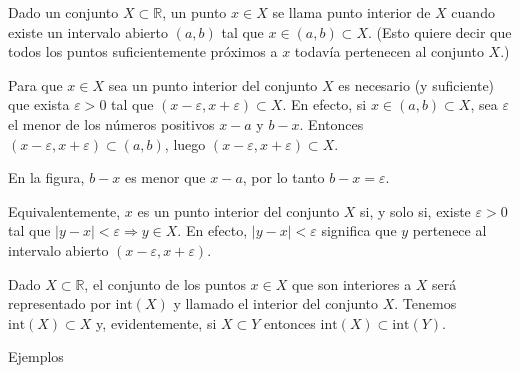 \documentclass[12pt,oneside]{book}
\begin{document}
Dado un conjunto \(X \subset \mathbb{R}\), un punto \(x \in X\) se llama punto interior de \(X\) cuando existe un intervalo abierto \((a, b)\) tal que \(x \in (a, b) \subset X\). (Esto quiere decir que todos los puntos suficientemente próximos a \(x\) todavía pertenecen al conjunto \(X\).)

Para que \(x \in X\) sea un punto interior del conjunto \(X\) es necesario (y suficiente) que exista \(\varepsilon > 0\) tal que \((x - \varepsilon, x + \varepsilon) \subset X\). En efecto, si \(x \in (a, b) \subset X\), sea \(\varepsilon\) el menor de los números positivos \(x - a\) y \(b - x\). Entonces \((x - \varepsilon, x + \varepsilon) \subset (a, b)\), luego \((x - \varepsilon, x + \varepsilon) \subset X\).

\begin{center}
\end{center}

En la figura, \( b - x \) es menor que \( x - a \), por lo tanto \( b - x = \varepsilon \).

Equivalentemente, \(x\) es un punto interior del conjunto \(X\) si, y solo si, existe \(\varepsilon > 0\) tal que \(|y - x| < \varepsilon \Rightarrow y \in X\). En efecto, \(|y - x| < \varepsilon\) significa que \(y\) pertenece al intervalo abierto \((x - \varepsilon, x + \varepsilon)\).

Dado \(X \subset \mathbb{R}\), el conjunto de los puntos \(x \in X\) que son interiores a \(X\) será representado por \(\text{int}(X)\) y llamado el interior del conjunto \(X\). Tenemos \(\text{int}(X) \subset X\) y, evidentemente, si \(X \subset Y\) entonces \(\text{int}(X) \subset \text{int}(Y)\).

Ejemplos
\end{document}
